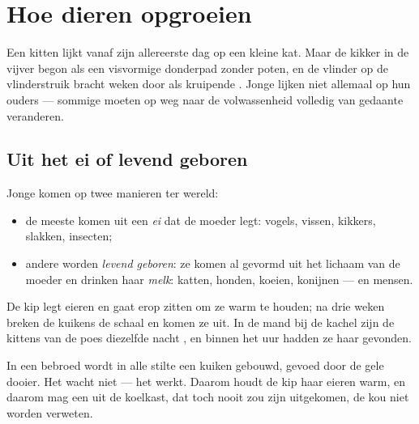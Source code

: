 \chapter{Hoe dieren opgroeien}\label{ch:g2:animals-grow-up}

Een kitten lijkt vanaf zijn allereerste dag op een kleine kat. Maar de
kikker in de vijver begon als een visvormige donderpad zonder poten, en
de vlinder op de vlinderstruik bracht weken door als kruipende .
Jonge  lijken niet allemaal op hun ouders --- sommige moeten op
weg naar de volwassenheid volledig van gedaante veranderen.

\section{Uit het ei of levend geboren}

\begin{definition}\label{def:g2:animals-grow-up:born}
Jonge  komen op twee manieren ter wereld:
\begin{itemize}
  \item de meeste komen uit een \emph{ei} dat de moeder legt:
        vogels, vissen, kikkers, slakken, insecten;
  \item andere worden \emph{levend geboren}: ze
        komen al gevormd uit het lichaam van de moeder en drinken haar
        \emph{melk}: katten, honden, koeien, konijnen ---
        en mensen.
\end{itemize}
\end{definition}

\begin{example}\label{ex:g2:animals-grow-up:henhouse}
De kip legt eieren en gaat erop zitten om ze warm te houden; na drie
weken breken de kuikens de schaal en komen ze uit. In de mand bij de
kachel zijn de kittens van de poes diezelfde nacht , en
binnen het uur hadden ze haar  gevonden.
\end{example}

\begin{remark}\label{rem:g2:animals-grow-up:egg}
In een bebroed  wordt in alle stilte een kuiken gebouwd, gevoed door
de gele dooier. Het  wacht niet --- het werkt. Daarom houdt de kip
haar eieren warm, en daarom mag een  uit de koelkast, dat toch nooit
zou zijn uitgekomen, de kou niet worden verweten.
\end{remark}

